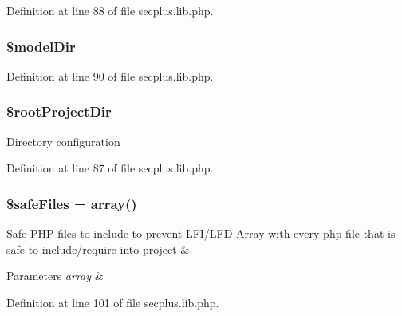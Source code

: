 Definition at line 88 of file secplus.lib.php.

\hypertarget{class_sec_plus_1_1_config_a0a45e14f2c297b0c0e8f956085385548}{
\subsubsection[{\$modelDir}]{\setlength{\rightskip}{0pt plus 5cm}\$modelDir}}
\label{class_sec_plus_1_1_config_a0a45e14f2c297b0c0e8f956085385548}


Definition at line 90 of file secplus.lib.php.

\hypertarget{class_sec_plus_1_1_config_a95fa44cd6d4c68d1925ad70e41c0dd74}{
\subsubsection[{\$rootProjectDir}]{\setlength{\rightskip}{0pt plus 5cm}\$rootProjectDir}}
\label{class_sec_plus_1_1_config_a95fa44cd6d4c68d1925ad70e41c0dd74}
Directory configuration 

Definition at line 87 of file secplus.lib.php.

\hypertarget{class_sec_plus_1_1_config_a0bc64f3b8da4ca7ce528a3d92894fda5}{
\subsubsection[{\$safeFiles}]{\setlength{\rightskip}{0pt plus 5cm}\$safeFiles = array()}}
\label{class_sec_plus_1_1_config_a0bc64f3b8da4ca7ce528a3d92894fda5}
Safe PHP files to include to prevent LFI/LFD Array with every php file that is safe to include/require into project \& 
\begin{DoxyParams}{Parameters}
{\em array} & \\
\hline
\end{DoxyParams}


Definition at line 101 of file secplus.lib.php.

